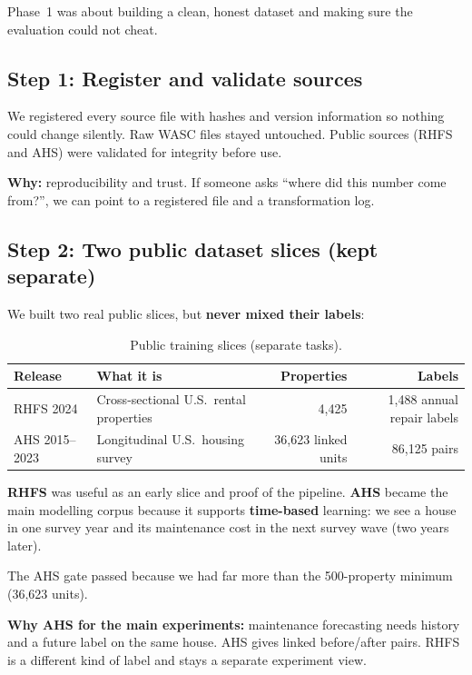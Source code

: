 \documentclass[11pt,a4paper]{article}
\begin{document}
Phase~1 was about building a clean, honest dataset and making sure the evaluation could not cheat.

\subsection{Step 1: Register and validate sources}

We registered every source file with hashes and version information so nothing could change silently. Raw WASC files stayed untouched. Public sources (RHFS and AHS) were validated for integrity before use.

\textbf{Why:} reproducibility and trust. If someone asks ``where did this number come from?'', we can point to a registered file and a transformation log.

\subsection{Step 2: Two public dataset slices (kept separate)}

We built two real public slices, but \textbf{never mixed their labels}:

\begin{table}[ht]
\centering
\caption{Public training slices (separate tasks).}
\begin{tabular}{@{}llrr@{}}
\toprule
Release & What it is & Properties & Labels \\
\midrule
RHFS 2024 & Cross-sectional U.S.\ rental properties & 4,425 & 1,488 annual repair labels \\
AHS 2015--2023 & Longitudinal U.S.\ housing survey & 36,623 linked units & 86,125 pairs \\
\bottomrule
\end{tabular}
\end{table}

\textbf{RHFS} was useful as an early slice and proof of the pipeline. \textbf{AHS} became the main modelling corpus because it supports \textbf{time-based} learning: we see a house in one survey year and its maintenance cost in the next survey wave (two years later).

The AHS gate passed because we had far more than the 500-property minimum (36,623 units).

\textbf{Why AHS for the main experiments:} maintenance forecasting needs history and a future label on the same house. AHS gives linked before/after pairs. RHFS is a different kind of label and stays a separate experiment view.
\end{document}
